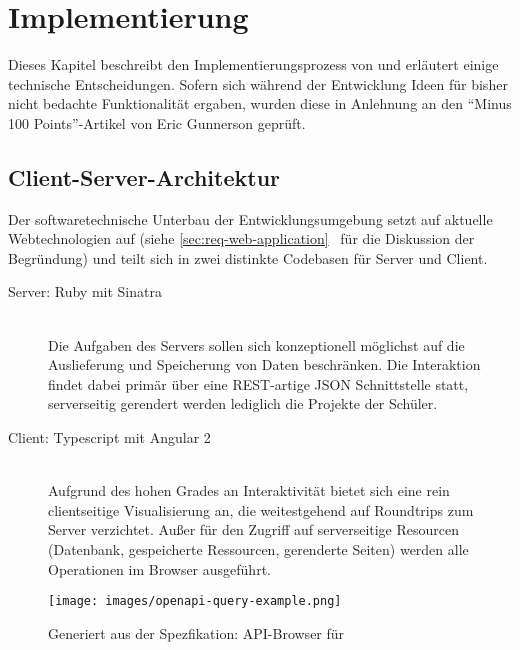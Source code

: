 \section{Implementierung}
\label{sec:implementation-analysis}

Dieses Kapitel beschreibt den Implementierungsprozess von \idename{} und erläutert einige technische Entscheidungen. Sofern sich während der Entwicklung Ideen für bisher nicht bedachte Funktionalität ergaben, wurden diese in Anlehnung an den "`Minus 100 Points"'-Artikel von Eric Gunnerson \cite{gunnerson-minus-100} geprüft.


\subsection{Client-Server-Architektur}

Der softwaretechnische Unterbau der Entwicklungsumgebung setzt auf aktuelle Webtechnologien auf (siehe \ref{sec:req-web-application}~ für die Diskussion der Begründung) und teilt sich in zwei distinkte Codebasen für Server und Client.

\begin{description}
\item[Server: Ruby mit Sinatra] \hfill\\
  Die Aufgaben des Servers sollen sich konzeptionell möglichst auf die Auslieferung und Speicherung von Daten beschränken. Die Interaktion findet dabei primär über eine REST-artige JSON Schnittstelle statt, serverseitig gerendert werden lediglich die Projekte der Schüler.
\item[Client: Typescript mit Angular 2] \hfill\\
  Aufgrund des hohen Grades an Interaktivität bietet sich eine rein clientseitige Visualisierung an, die weitestgehend auf Roundtrips zum Server verzichtet. Außer für den Zugriff auf serverseitige Resourcen (Datenbank, gespeicherte Ressourcen, gerenderte Seiten) werden alle Operationen im Browser ausgeführt.
\end{description}

\begin{figure}[p]
  \centering \texttt{[image: images/openapi-query-example.png]}
  \caption{Generiert aus der Spezfikation: API-Browser für \idename{}}
  \label{fig:openapi-query-example}
\end{figure}


